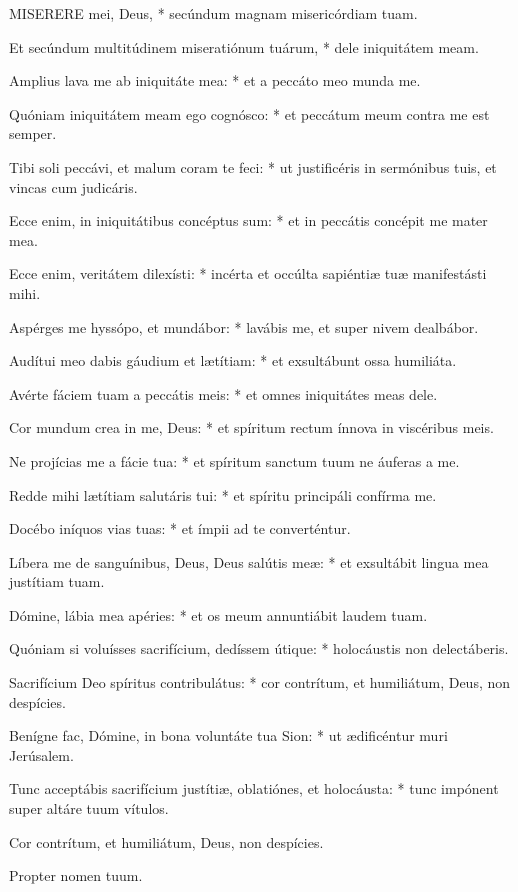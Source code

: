 
\lettrine[lines=2]{M}{ISERERE} mei, Deus, * secúndum magnam misericórdiam tuam.

Et secúndum multitúdinem miseratiónum tuárum, * dele iniquitátem meam.

Amplius lava me ab iniquitáte mea: * et a peccáto meo munda me.

Quóniam iniquitátem meam ego cognósco: * et peccátum meum contra me est semper.

Tibi soli peccávi, et malum coram te feci: * ut justificéris in sermónibus tuis, et vincas cum judicáris.

Ecce enim, in iniquitátibus concéptus sum: * et in peccátis concépit me mater mea.

Ecce enim, veritátem dilexísti: * incérta et occúlta sapiéntiæ tuæ manifestásti mihi.

Aspérges me hyssópo, et mundábor: * lavábis me, et super nivem dealbábor.

Audítui meo dabis gáudium et lætítiam: * et exsultábunt ossa humiliáta.

Avérte fáciem tuam a peccátis meis: * et omnes iniquitátes meas dele.

Cor mundum crea in me, Deus: * et spíritum rectum ínnova in viscéribus meis.

Ne projícias me a fácie tua: * et spíritum sanctum tuum ne áuferas a me.

Redde mihi lætítiam salutáris tui: * et spíritu principáli confírma me.

Docébo iníquos vias tuas: * et ímpii ad te converténtur.

Líbera me de sanguínibus, Deus, Deus salútis meæ: * et exsultábit lingua mea justítiam tuam.

Dómine, lábia mea apéries: * et os meum annuntiábit laudem tuam.

Quóniam si voluísses sacrifícium, dedíssem útique: * holocáustis non delectáberis.

Sacrifícium Deo spíritus contribulátus: * cor contrítum, et humiliátum, Deus, non despícies.

Benígne fac, Dómine, in bona voluntáte tua Sion: * ut ædificéntur muri Jerúsalem.

Tunc acceptábis sacrifícium justítiæ, oblatiónes, et holocáusta: * tunc impónent super altáre tuum vítulos.

 Cor contrítum, et humiliátum, Deus, non despícies.

 Propter nomen tuum.

